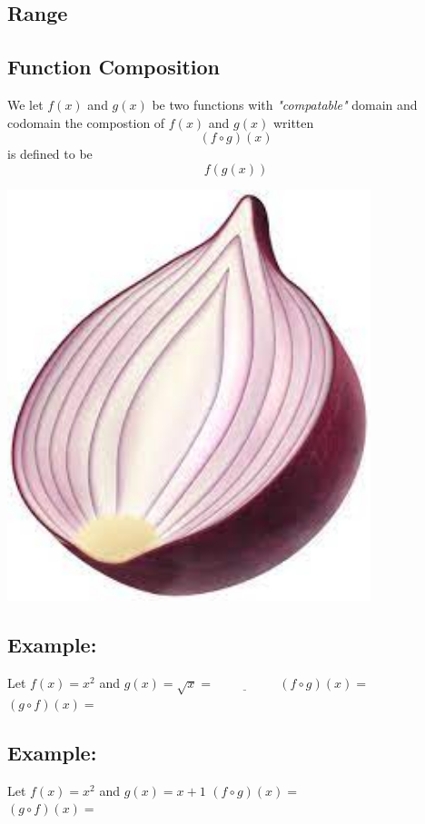 \documentclass[20pt]{extarticle}
\newcommand{\LP}{\left(}
\newcommand{\RP}{\right)}
\begin{document}
\subsection*{\textbf{\color{draculaorange}Range}}
\newpage

\subsection*{\textbf{\color{draculaorange}Function Composition}}
We let \(f(x)\) and \(g(x)\) be two functions with
\textit{\color{draculayellow}"compatable"} domain and codomain
\vskip4cm
the compostion of \(f(x)\) and \(g(x)\) written \[\LP f\circ g\RP(x)\]
is defined to be
\[f\LP g\LP x\RP\RP\]
\begin{center}
  \includegraphics[height=12cm]{onion.jpeg}
\end{center}
\newpage
\subsection*{\textbf{\color{draculared}Example:}}
Let \(f(x)=x^2\) and \(g(x)=\sqrt{x}=\underline{\hspace{2cm}}\)
\vskip4cm
\(\LP f\circ g\RP(x)=\)\\
\vskip8cm
\(\LP g\circ f\RP(x)=\)\\
\newpage
\subsection*{\textbf{\color{draculared}Example:}}
Let \(f(x)=x^2\) and \(g(x)=x+1\)
\vskip4cm
\(\LP f\circ g\RP(x)=\)\\
\vskip8cm
\(\LP g\circ f\RP(x)=\)\\
\newpage
\end{document}
